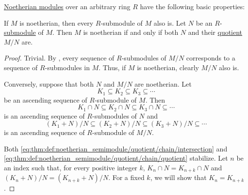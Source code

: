 \begin{proposition}\label{thm:def:noetherian_semimodule}
  \hyperref[def:noetherian_semimodule]{Noetherian modules} over an arbitrary ring \( R \) have the following basic properties:
  \begin{thmenum}
     If \( M \) is noetherian, then every \( R \)-submodule of \( M \) also is.
     Let \( N \) be an \( R \)-\hyperref[def:module/subobject]{submodule} of \( M \). Then \( M \) is noetherian if and only if both \( N \) and their \hyperref[def:module/quotient]{quotient} \( M / N \) are.
  \end{thmenum}
\end{proposition}
\begin{proof}
   Trivial.
   By , every sequence of \( R \)-submodules of \( M / N \) corresponds to a sequence of \( R \)-submodules in \( M \). Thus, if \( M \) is noetherian, clearly \( M / N \) also is.

  Conversely, suppose that both \( N \) and \( M / N \) are noetherian. Let
  \begin{equation}\label{eq:thm:def:noetherian_semimodule/quotient/chain}
    K_1 \subseteq K_2 \subseteq K_3 \subseteq \cdots
  \end{equation}
  be an ascending sequence of \( R \)-submodule of \( M \). Then
  \begin{equation}\label{eq:thm:def:noetherian_semimodule/quotient/chain/intersection}
    K_1 \cap N \subseteq K_2 \cap N \subseteq K_3 \cap N \subseteq \cdots
  \end{equation}
  is an ascending sequence of \( R \)-submodules of \( N \) and
  \begin{equation}\label{eq:thm:def:noetherian_semimodule/quotient/chain/quotient}
    (K_1 + N) / N \subseteq (K_2 + N) / N \subseteq (K_3 + N) / N \subseteq \cdots
  \end{equation}
  is an ascending sequence of \( R \)-submodule of \( M / N \).

  Both \eqref{eq:thm:def:noetherian_semimodule/quotient/chain/intersection} and \eqref{eq:thm:def:noetherian_semimodule/quotient/chain/quotient} stabilize. Let \( n \) be an index such that, for every positive integer \( k \), \( K_n \cap N = K_{n + k} \cap N \) and \( (K_n + N) / N = (K_{n + k} + N) / N \). For a fixed \( k \), we will show that \( K_n = K_{n + k} \).


\end{proof}
